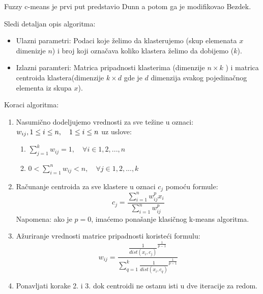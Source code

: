 \documentclass{article}
\begin{document}
{\selectfont Fuzzy c-means} je prvi put predstavio {\selectfont Dunn} a potom ga je modifikovao {\selectfont Bezdek}.

Sledi detaljan opis algoritma:

\begin{itemize}

\item Ulazni parametri: Podaci koje \v{z}elimo da klasterujemo (skup elemenata $x$ dimenizje $n$) i broj koji ozna\v{c}ava koliko klastera \v{z}elimo da dobijemo ($k$).
\item Izlazni paramteri: Matrica pripadnosti klasterima (dimenzije $n \times k$ ) i matrica centroida klastera(dimenzije $k \times d$ gde je $d$ dimenzija svakog pojedina\v{c}nog elementa iz skupa $x$).

\end{itemize}

Koraci algoritma:

\begin{enumerate}

\item Nasumi\v{c}no dodeljujemo vrednosti za sve te\v{z}ine u oznaci: $w_{ij}, \\ 1\leq i \leq n, \quad 1\leq i \leq n$ uz uslove:
\begin{enumerate}
\item $ \sum_{j=1}^k w_{ij} = 1, \quad \forall i\in {1,2,...,n}$
\item $ 0 < \sum_{i=1}^n w_{ij} < n, \quad \forall j\in {1,2,...,k} $
\end{enumerate}
\item Ra\v{c}unanje centroida za sve klastere u oznaci $c_j$ pomo\'{c}u formule:
\begin{equation}
c_j = \frac{\sum_{i=1}^n w_{ij}^p x_i}{\sum_{i=1}^n w_{ij}^p}
\end{equation}
Napomena: ako je $p = 0$, ima\'{c}emo pona\v{s}anje klasi\v{c}nog {\selectfont k-means} algoritma.
\item A\v{z}uriranje vrednosti matrice pripadnosti koriste\'{c}i formulu:
\begin{equation}
w_{ij} = \frac{\frac{1}{dist(x_i, c_j)}^\frac{1}{p-1}}{\sum_{q=1}^k \frac{1}{dist(x_i, c_q)}^\frac{1}{p-1}}
\end{equation}
\item Ponavljati korake 2. i 3. dok centroidi ne ostanu isti u dve iteracije za redom.

\end{enumerate}
\end{document}
